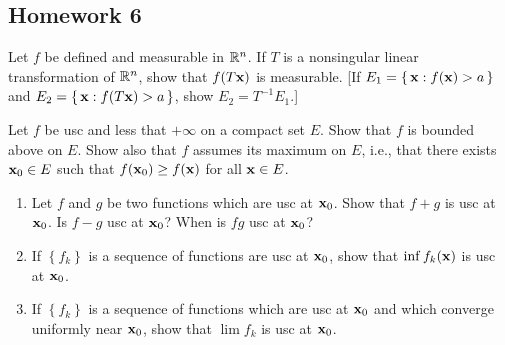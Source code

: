 \subsection{Homework 6}
\begin{problem}
Let $f$ be defined and measurable in $\mathbb{R}^n$. If $T$ is a nonsingular
linear transformation of $\mathbb{R}^n$, show that $f(T\mathbf{x})$ is measurable. [If
$E_1=\left\{\,\mathbf{x}: f(\mathbf{x})>a\,\right\}$ and
$E_2=\left\{\,\mathbf{x}:f(T\mathbf{x})>a\,\right\}$, show $E_2=T^{-1}E_1$.]
\end{problem}
\begin{solution}
\end{solution}

\begin{problem}
Let $f$ be usc and less that $+\infty$ on a compact set $E$. Show that $f$
is bounded above on $E$. Show also that $f$ assumes its maximum on $E$,
i.e., that there exists $\mathbf{x}_0\in E$ such that $f(\mathbf{x}_0)\geq f(\mathbf{x})$ for
all $\mathbf{x}\in E$.
\end{problem}
\begin{solution}
\end{solution}

\begin{problem}
\begin{enumerate}[label=(\alph*),noitemsep]
\item Let $f$ and $g$ be two functions which are usc at $\mathbf{x}_0$. Show that
  $f+g$ is usc at $\mathbf{x}_0$. Is $f-g$ usc at $\mathbf{x}_0$? When is $fg$ usc at
  $\mathbf{x}_0$?
\item If $\left\{f_k\right\}$ is a sequence of functions are usc at
  $\mathbf{x}_0$, show that $\inf f_k(\mathbf{x})$ is usc at $\mathbf{x}_0$.
\item If $\left\{f_k\right\}$ is a sequence of functions which are usc at
  $\mathbf{x}_0$ and which converge uniformly near $\mathbf{x}_0$, show that $\lim f_k$
  is usc at $\mathbf{x}_0$.
\end{enumerate}
\end{problem}
\begin{solution}
\end{solution}

